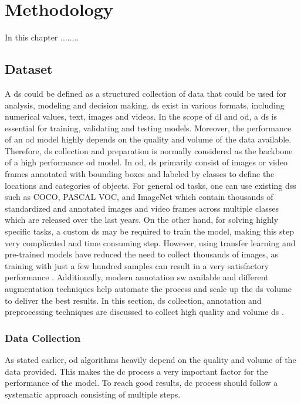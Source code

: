 

\chapter{Methodology} \label{ch:methodology}
In this chapter ........

\section{Dataset}
A \gls{ds} could be defined as a structured collection of data that could be used for analysis, modeling and decision making. \gls{ds} exist in various formats, including numerical values, text, images and videos. In the scope of \gls{dl} and \gls{od}, a \gls{ds} is essential for training, validating and testing models. Moreover, the performance of an \gls{od} model highly depends on the quality and volume of the data available. Therefore, \gls{ds} collection and preparation is normally considered as the backbone of a high performance \gls{od} model. In \gls{od}, \gls{ds} primarily consist of images or video frames annotated with bounding boxes and labeled by classes to define the locations and categories of objects. For general \gls{od} tasks, one can use existing \gls{ds}s such as COCO, PASCAL VOC, and ImageNet which contain thousands of standardized and annotated images and video frames across multiple classes which are released over the last years. On the other hand, for solving highly specific tasks, a custom \gls{ds} may be required to train the model, making this step very complicated and time consuming step. However, using transfer learning and pre-trained models have reduced the need to collect thousands of images, as training with just a few hundred samples can result in a very satisfactory performance \cite{IBM_Transfer_Learning}. Additionally, modern annotation \gls{sw} available and different augmentation techniques help automate the process and scale up the \gls{ds} volume to deliver the best results. In this section, \gls{ds} collection, annotation and preprocessing techniques are discussed to collect high quality and volume \gls{ds} \cite{oD_Review}.

\subsection{Data Collection}
As stated earlier, \gls{od} algorithms heavily depend on the quality and volume of the data provided. This makes the \gls{dc} process a very important factor for the performance of the model. To reach good results, \gls{dc} process should follow a systematic approach consisting of multiple steps.

